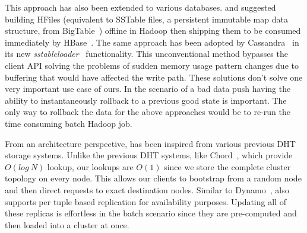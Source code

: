 This approach has also been extended to various databases. \citet{konstantinou}
and \citet{barbuzzi} suggested building HFiles (equivalent to SSTable files, a
persistent immutable map data structure, from BigTable~\cite{bigtable}) offline
in Hadoop then shipping them to be consumed immediately by HBase~\cite{hbase}.
The same approach has been adopted by Cassandra~\cite{cassandra} in its new
\emph{sstableloader}~\cite{cassandra_bulk} functionality. This unconventional
method bypasses the client API solving the problems of sudden memory usage
pattern changes due to buffering that would have affected the write path. These
solutions don't solve one very important use case of ours. In the scenario of a
bad data push having the ability to instantaneously rollback to a previous good
state is important. The only way to rollback the data for the above approaches
would be to re-run the time consuming batch Hadoop job.

From an architecture perspective, \projectname{} has been inspired from various
previous DHT storage systems. Unlike the previous DHT systems, like
Chord~\cite{chord}, which provide $O(log~N)$ lookup, our lookups are $O(1)$
since we store the complete cluster topology on every node. This allows our
clients to bootstrap from a random node and then direct requests to exact
destination nodes. Similar to Dynamo~\cite{dynamo}, \projectname{} also
supports per tuple based replication for availability purposes. Updating all of
these replicas is effortless in the batch scenario since they are pre-computed
and then loaded into a \projectname{} cluster at once. 

